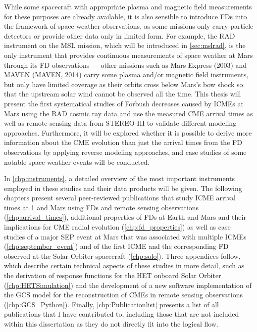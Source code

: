 While some spacecraft with appropriate plasma and magnetic field measurements for these purposes are already available, it is also sensible to introduce \acp{FD} into the framework of space weather observations, as some missions only carry particle detectors or provide other data only in limited form. For example, the \ac{RAD} instrument on the \ac{MSL} mission, which will be introduced in \autoref{sec:mslrad}, is the only instrument that provides continuous measurements of space weather at Mars through its \ac{FD} observations --- other missions such as Mars Express (2003) and \acl{MAVEN} (\acs{MAVEN}, 2014) carry some plasma and/or magnetic field instruments, but only have limited coverage as their orbits cross below Mars's bow shock so that the upstream solar wind cannot be observed all the time. This thesis will present the first systematical studies of Forbush decreases caused by \acp{ICME} at Mars using the \ac{RAD} cosmic ray data and use the measured \ac{CME} arrival times as well as remote sensing data from \ac{STEREO}-\ac{HI} to validate different modeling approaches. Furthermore, it will be explored whether it is possible to derive more information about the \ac{CME} evolution than just the arrival times from the \ac{FD} observations by applying reverse modeling approaches, and case studies of some notable space weather events will be conducted.

In \autoref{chp:instruments}, a detailed overview of the most important instruments employed in these studies and their data products will be given. The following chapters present several peer-reviewed publications that study \ac{ICME} arrival times at \SI{1}{\AU} and Mars using \acp{FD} and remote sensing observations (\autoref{chp:arrival_times}), additional properties of \acp{FD} at Earth and Mars and their implications for \ac{CME} radial evolution (\autoref{chp:fd_properties}) as well as case studies of a major \ac{SEP} event at Mars that was associated with multiple \acp{ICME} (\autoref{chp:september_event}) and of the first \ac{ICME} and the corresponding \ac{FD} observed at the Solar Orbiter spacecraft (\autoref{chp:solo}). Three appendices follow, which describe certain technical aspects of these studies in more detail, such as the derivation of response functions for the \ac{HET} onboard Solar Orbiter (\autoref{chp:HETSimulation}) and the development of a new software implementation of the \ac{GCS} model for the reconstruction of \acp{CME} in remote sensing observations (\autoref{chp:GCS_Python}). Finally, \autoref{chp:Publicationlist} presents a list of all publications that I have contributed to, including those that are not included within this dissertation as they do not directly fit into the logical flow.
